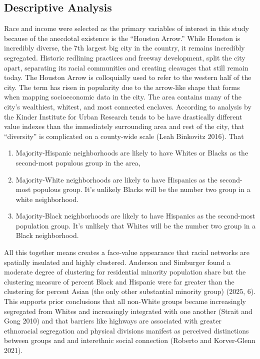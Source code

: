 \documentclass[
]{article}
\providecommand{\tightlist}{%
  \setlength{\itemsep}{0pt}\setlength{\parskip}{0pt}}
\begin{document}
\subsection{Descriptive Analysis}\label{descriptive-analysis}

Race and income were selected as the primary variables of interest in
this study because of the anecdotal existence is the ``Houston Arrow.''
While Houston is incredibly diverse, the 7th largest big city in the
country, it remains incredibly segregated. Historic redlining practices
and freeway development, split the city apart, separating its racial
communities and creating cleavages that still remain today. The Houston
Arrow is colloquially used to refer to the western half of the city. The
term has risen in popularity due to the arrow-like shape that forms when
mapping socioeconomic data in the city. The area contains many of the
city's wealthiest, whitest, and most connected enclaves. According to
analysis by the Kinder Institute for Urban Research tends to be have
drastically different value indexes than the immediately surrounding
area and rest of the city, that ``diversity'' is complicated on a
county-wide scale (Leah Binkovitz 2016). That

\begin{enumerate}
\def\labelenumi{\arabic{enumi}.}
\tightlist
\item
  Majority-Hispanic neighborhoods are likely to have Whites or Blacks as
  the second-most populous group in the area,
\item
  Majority-White neighborhoods are likely to have Hispanics as the
  second-most populous group. It's unlikely Blacks will be the number
  two group in a white neighborhood.
\item
  Majority-Black neighborhoods are likely to have Hispanics as the
  second-most population group. It's unlikely that Whites will be the
  number two group in a Black neighborhood.
\end{enumerate}

All this together means creates a face-value appearance that racial
networks are spatially insulated and highly clustered. Anderson and
Simburger found a moderate degree of clustering for residential minority
population share but the clustering measure of percent Black and
Hispanic were far greater than the clustering for percent Asian (the
only other substantial minority group) (2025, 6). This supports prior
conclusions that all non-White groups became increasingly segregated
from Whites and increasingly integrated with one another (Strait and
Gong 2010) and that barriers like highways are associated with greater
ethnoracial segregation and physical divisions manifest as perceived
distinctions between groups and and interethnic social connection
(Roberto and Korver-Glenn 2021).
\end{document}

